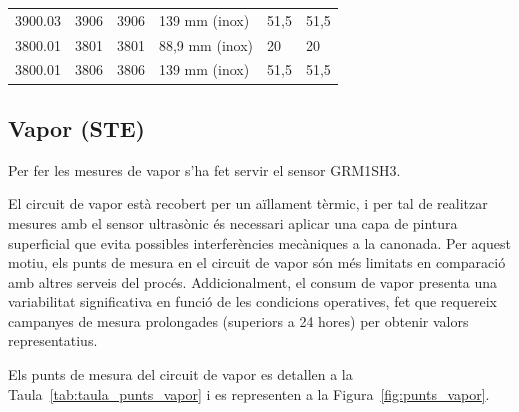\documentclass[11pt]{article}
\begin{document}
\begin{table}[htbp]
{\begin{tabular}{llllll}
            3900.03         & 3906                & 3906          & 139 mm (inox)     & 51,5                                         & 51,5                                        \\
            3800.01         & 3801                & 3801          & 88,9 mm (inox)    & 20                                           & 20                                          \\
            3800.01         & 3806                & 3806          & 139 mm (inox)     & 51,5                                         & 51,5                                        \\
            \bottomrule
        \end{tabular}
    }
\end{table}

\subsection{Vapor (STE)}

Per fer les mesures de vapor s'ha fet servir el sensor GRM1SH3.

El circuit de vapor està recobert per un aïllament tèrmic, i per tal de realitzar mesures amb el sensor ultrasònic és necessari aplicar una capa de pintura superficial que evita possibles interferències mecàniques a la canonada. Per aquest motiu, els punts de mesura en el circuit de vapor són més limitats en comparació amb altres serveis del procés. Addicionalment, el consum de vapor presenta una variabilitat significativa en funció de les condicions operatives, fet que requereix campanyes de mesura prolongades (superiors a 24 hores) per obtenir valors representatius.

Els punts de mesura del circuit de vapor es detallen a la Taula~\ref{tab:taula_punts_vapor} i es representen a la Figura~\ref{fig:punts_vapor}.
\end{document}
